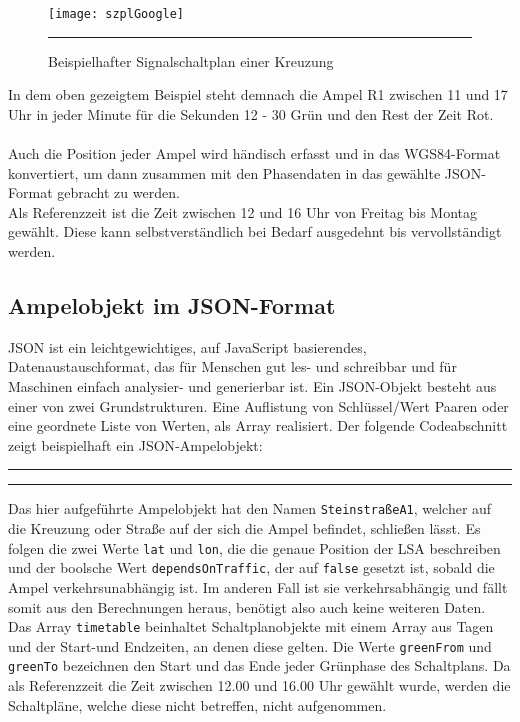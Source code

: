 \begin{figure}[H]
\centering
	\texttt{[image: szplGoogle]}
	\rule{36em}{0.5pt}
	\caption[Signalplan]{Beispielhafter Signalschaltplan einer Kreuzung}
	\label{fig:plan}	
\end{figure}
In dem oben gezeigtem Beispiel steht demnach die Ampel R1 zwischen 11 und 17 Uhr in jeder Minute für die Sekunden 12 - 30 Grün und den Rest der Zeit Rot.\\\\
Auch die Position jeder Ampel wird händisch erfasst und in das WGS84-Format konvertiert, um dann zusammen mit den Phasendaten in das gewählte \gls{JSON}-Format gebracht zu werden.\\
Als Referenzzeit ist die Zeit zwischen 12 und 16 Uhr von Freitag bis Montag gewählt. Diese kann selbstverständlich bei Bedarf ausgedehnt bis vervollständigt werden.
%
%
\subsection[Ampelobjekt im JSON-Format]{Ampelobjekt im \gls{JSON}-Format}
\gls{JSON} ist ein leichtgewichtiges, auf JavaScript basierendes, Datenaustauschformat, das für Menschen gut les- und schreibbar und für Maschinen einfach analysier- und generierbar ist. Ein \gls{JSON}-Objekt besteht aus einer von zwei Grundstrukturen. Eine Auflistung von Schlüssel/Wert Paaren oder eine geordnete Liste von Werten, als Array realisiert. Der folgende Codeabschnitt zeigt beispielhaft ein \gls{JSON}-Ampelobjekt:  
\begin{center}
\rule{35em}{0.5pt}

\rule{35em}{0.5pt}
\end{center}
Das hier aufgeführte Ampelobjekt hat den Namen \texttt{SteinstraßeA1}, welcher auf die Kreuzung oder Straße auf der sich die Ampel befindet, schließen lässt. Es folgen die zwei Werte \texttt{lat} und \texttt{lon}, die die genaue Position der \gls{LSA} beschreiben und der boolsche Wert \texttt{dependsOnTraffic}, der auf \texttt{false} gesetzt ist, sobald die Ampel verkehrsunabhängig ist. Im anderen Fall ist sie verkehrsabhängig und fällt somit aus den Berechnungen heraus, benötigt also auch keine weiteren Daten. Das Array \texttt{timetable} beinhaltet Schaltplanobjekte mit einem Array aus Tagen und der Start-und Endzeiten, an denen diese gelten. Die Werte \texttt{greenFrom} und \texttt{greenTo} bezeichnen den Start und das Ende jeder Grünphase des Schaltplans. Da als Referenzzeit die Zeit zwischen 12.00 und 16.00 Uhr gewählt wurde, werden die Schaltpläne, welche diese nicht betreffen, nicht aufgenommen.
\clearpage
